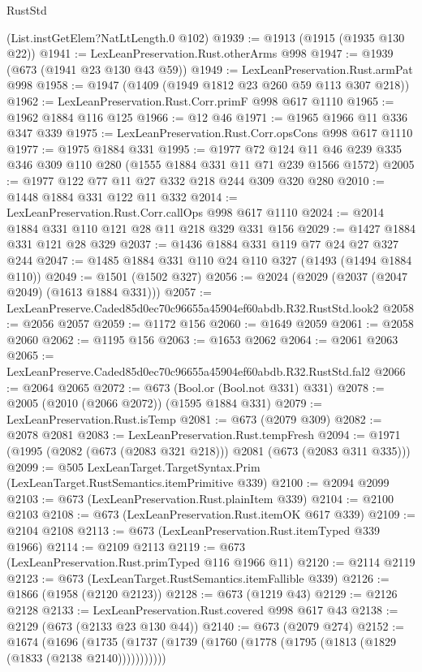 \begin{lexlean}{RustStd}
\begin{coremodule}
    (List.instGetElem?NatLtLength.{0} @102)
@1939 := @1913 (@1915 (@1935 @130 @22))
@1941 := LexLeanPreservation.Rust.otherArms @998
@1947 := @1939 (@673 (@1941 @23 @130 @43 @59))
@1949 := LexLeanPreservation.Rust.armPat @998
@1958 := @1947 (@1409 (@1949 @1812 @23 @260 @59 @113 @307 @218))
@1962 := LexLeanPreservation.Rust.Corr.primF @998 @617 @1110
@1965 := @1962 @1884 @116 @125
@1966 := @12 @46
@1971 := @1965 @1966 @11 @336 @347 @339
@1975 := LexLeanPreservation.Rust.Corr.opsCons @998 @617 @1110
@1977 := @1975 @1884 @331
@1995 := @1977
    @72
    @124
    @11
    @46
    @239
    @335
    @346
    @309
    @110
    @280
    (@1555 @1884 @331 @11 @71 @239 @1566 @1572)
@2005 := @1977 @122 @77 @11 @27 @332 @218 @244 @309 @320 @280
@2010 := @1448 @1884 @331 @122 @11 @332
@2014 := LexLeanPreservation.Rust.Corr.callOps @998 @617 @1110
@2024 := @2014 @1884 @331 @110 @121 @28 @11 @218 @329 @331 @156
@2029 := @1427 @1884 @331 @121 @28 @329
@2037 := @1436 @1884 @331 @119 @77 @24 @27 @327 @244
@2047 := @1485 @1884 @331 @110 @24 @110 @327 (@1493 (@1494 @1884 @110))
@2049 := @1501 (@1502 @327)
@2056 := @2024 (@2029 (@2037 (@2047 @2049) (@1613 @1884 @331)))
@2057 := LexLeanPreserve.Caded85d0ec70c96655a45904ef60abdb.R32.RustStd.look2
@2058 := @2056 @2057
@2059 := @1172 @156
@2060 := @1649 @2059
@2061 := @2058 @2060
@2062 := @1195 @156
@2063 := @1653 @2062
@2064 := @2061 @2063
@2065 := LexLeanPreserve.Caded85d0ec70c96655a45904ef60abdb.R32.RustStd.fal2
@2066 := @2064 @2065
@2072 := @673 (Bool.or (Bool.not @331) @331)
@2078 := @2005 (@2010 (@2066 @2072)) (@1595 @1884 @331)
@2079 := LexLeanPreservation.Rust.isTemp
@2081 := @673 (@2079 @309)
@2082 := @2078 @2081
@2083 := LexLeanPreservation.Rust.tempFresh
@2094 := @1971 (@1995 (@2082 (@673 (@2083 @321 @218))) @2081 (@673 (@2083 @311 @335)))
@2099 := @505 LexLeanTarget.TargetSyntax.Prim (LexLeanTarget.RustSemantics.itemPrimitive @339)
@2100 := @2094 @2099
@2103 := @673 (LexLeanPreservation.Rust.plainItem @339)
@2104 := @2100 @2103
@2108 := @673 (LexLeanPreservation.Rust.itemOK @617 @339)
@2109 := @2104 @2108
@2113 := @673 (LexLeanPreservation.Rust.itemTyped @339 @1966)
@2114 := @2109 @2113
@2119 := @673 (LexLeanPreservation.Rust.primTyped @116 @1966 @11)
@2120 := @2114 @2119
@2123 := @673 (LexLeanTarget.RustSemantics.itemFallible @339)
@2126 := @1866 (@1958 (@2120 @2123))
@2128 := @673 (@1219 @43)
@2129 := @2126 @2128
@2133 := LexLeanPreservation.Rust.covered @998 @617 @43
@2138 := @2129 (@673 (@2133 @23 @130 @44))
@2140 := @673 (@2079 @274)
@2152 := @1674
    (@1696 (@1735 (@1737 (@1739 (@1760 (@1778 (@1795 (@1813 (@1829 (@1833 (@2138 @2140)))))))))))

\end{coremodule}
\end{lexlean}
